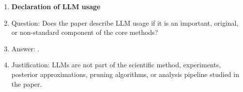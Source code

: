 \begin{enumerate}
\item {\bf Declaration of LLM usage}
    \item[] Question: Does the paper describe LLM usage if it is an important, original, or non-standard component of the core methods?
    \item[] Answer: \answerNA{}.
    \item[] Justification: LLMs are not part of the scientific method, experiments, posterior approximations, pruning algorithms, or analysis pipeline studied in the paper.
\end{enumerate}
